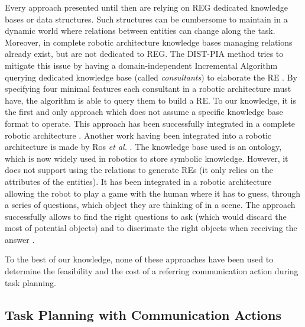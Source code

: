 \documentclass[a4paper,11pt,twoside]{StyleThese}
\begin{document}
Every approach presented until then are relying on REG dedicated knowledge bases or data structures. Such structures can be cumbersome to maintain in a dynamic world where relations between entities can change along the task. Moreover, in complete robotic architecture knowledge bases managing relations already exist, but are not dedicated to REG. The DIST-PIA method tries to mitigate this issue by having a domain-independent Incremental Algorithm querying dedicated knowledge base (called \textit{consultants}) to elaborate the RE \cite{williams2017referring}. By specifying four minimal features each consultant in a robotic architecture must have, the algorithm is able to query them to build a RE. To our knowledge, it is the first and only approach which does not assume a specific knowledge base format to operate. This approach has been successfully integrated in a complete robotic architecture \cite{williams2019dempster}. Another work having been integrated into a robotic architecture is made by Ros \textit{et al.} \cite{ros2010one}. The knowledge base used is an ontology, which is now widely used in robotics to store symbolic knowledge. However, it does not support using the relations to generate REs (it only relies on the attributes of the entities). It has been integrated in a robotic architecture allowing the robot to play a game with the human where it has to guess, through a series of questions, which object they are thinking of in a scene. The approach successfully allows to find the right questions to ask (which would discard the most of potential objects) and to discrimate the right objects when receiving the answer \cite{lemaignan2012grounding}.

To the best of our knowledge, none of these approaches have been used to determine the feasibility and the cost of a referring communication action during task planning.



\subsection{Task Planning with Communication Actions}
\end{document}
